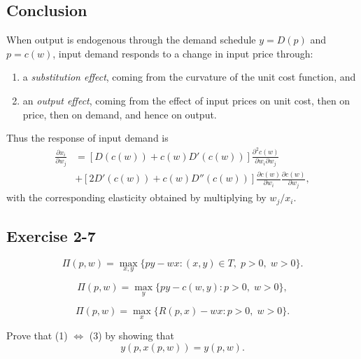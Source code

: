 \subsection*{Conclusion}

When output is endogenous through the demand schedule \(y=D(p)\) and \(p=c(w)\), input demand responds to a change in input price through:
\begin{enumerate}
\item a \emph{substitution effect}, coming from the curvature of the unit cost function, and
\item an \emph{output effect}, coming from the effect of input prices on unit cost, then on price, then on demand, and hence on output.
\end{enumerate}

Thus the response of input demand is
\[
\boxed{
\begin{aligned}
\frac{\partial x_i}{\partial w_j}
&=
\left[D(c(w))+c(w)D'(c(w))\right]\frac{\partial^2 c(w)}{\partial w_i\partial w_j}\\
&+
\left[2D'(c(w))+c(w)D''(c(w))\right]
\frac{\partial c(w)}{\partial w_i}
\frac{\partial c(w)}{\partial w_j},
\end{aligned}
}
\]
with the corresponding elasticity obtained by multiplying by \(w_j/x_i\).


\vspace{30pt}
\begin{tcolorbox}[breakable]

\subsection*{Exercise 2-7}

\begin{equation}
\Pi(p,w)=\max_{x,y}\{py-wx : (x,y)\in T,\; p>0,\; w>0\}. \tag{1}
\end{equation}

\begin{equation}
\Pi(p,w)=\max_{y}\{py-c(w,y) : p>0,\; w>0\}, \tag{2}
\end{equation}

\begin{equation}
\Pi(p,w)=\max_{x}\{R(p,x)-wx : p>0,\; w>0\}. \tag{3}
\end{equation}




Prove that (1) $\iff$ (3) by showing that
\[
y(p,x(p,w)) = y(p,w).
\]
\end{tcolorbox}


